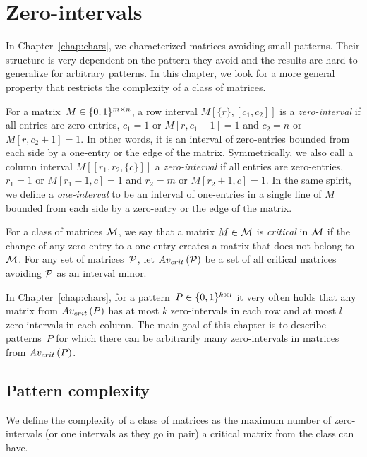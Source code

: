 \chapter{Zero-intervals}
\label{chap:ints}
In Chapter~\ref{chap:chars}, we characterized matrices avoiding small patterns. Their structure is very dependent on the pattern they avoid and the results are hard to generalize for arbitrary patterns. In this chapter, we look for a more general property that restricts the complexity of a class of matrices.

\begin{defn}
For a matrix~$M\in\{0,1\}^{m\times n}$, a row interval $M[\{r\},[c_1,c_2]]$ is a \emph{zero-interval} if all entries are zero-entries, $c_1=1$ or $M[r,c_1-1]=1$ and $c_2=n$ or $M[r,c_2+1]=1$. In other words, it is an interval of zero-entries bounded from each side by a one-entry or the edge of the matrix. Symmetrically, we also call a column interval $M[[r_1,r_2,\{c\}]]$ a \emph{zero-interval} if all entries are zero-entries, $r_1=1$ or $M[r_1-1,c]=1$ and $r_2=m$ or $M[r_2+1,c]=1$. In the same spirit, we define a \emph{one-interval} to be an interval of one-entries in a single line of $M$ bounded  from each side by a zero-entry or the edge of the matrix.
\end{defn}

\begin{defn}
For a class of matrices $\mathcal{M}$, we say that a matrix $M\in\mathcal{M}$ is \emph{critical} in $\mathcal{M}$ if the change of any zero-entry to a one-entry creates a matrix that does not belong to $\mathcal{M}$. For any set of matrices~$\mathcal{P}$, let $Av_{crit}\left(\mathcal{P}\right)$ be a set of all critical matrices avoiding $\mathcal{P}$ as an interval minor.
\end{defn}

In Chapter~\ref{chap:chars}, for a pattern~$P\in\{0,1\}^{k\times l}$ it very often holds that any matrix from $Av_{crit}\left(P\right)$ has at most $k$ zero-intervals in each row and at most $l$ zero-intervals in each column. The main goal of this chapter is to describe patterns~$P$ for which there can be arbitrarily many zero-intervals in matrices from $Av_{crit}\left(P\right)$.

\section{Pattern complexity}
We define the complexity of a class of matrices as the maximum number of zero-intervals (or one intervals as they go in pair) a critical matrix from the class can have.

